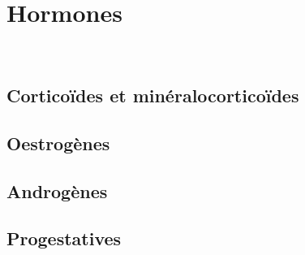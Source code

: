 \section{Hormones}

\begin{boiteCodeTex}{}
  \chemfig{!\creatinine}
  \chemfig{!\DOPA}
  \chemfig{!\DOPAH} \\[8pt]
  \chemfig{!\prostaglandine}
\end{boiteCodeTex}

\subsection{Corticoïdes et minéralocorticoïdes}

\begin{boiteCodeTex}{}
  \chemfig{!\cortisol} \hspace*{-50pt}
  \chemfig{!\corticosterone} \hspace*{-64pt}
  \chemfig{!\aldosterone}
\end{boiteCodeTex}

\subsection{Oestrogènes}

\begin{boiteCodeTex}{}
  \chemfig{!\estrone} \hspace*{-40pt}
  \chemfig{!\estriol} \hspace*{-56pt}
  \chemfig{!\estradiol}
\end{boiteCodeTex}

\subsection{Androgènes}

\begin{boiteCodeTex}{}
  \chemfig{!\testosterone} \hspace*{-12pt}
  \chemfig{!\dihydrotestosterone} \hspace*{-12pt}
  \chemfig{!\androstenedione}
\end{boiteCodeTex}

\begin{boiteCodeTex}{}
  \chemfig{!\DHEA}
  \chemfig{!\DHEAS}
\end{boiteCodeTex}

\subsection{Progestatives}

\begin{boiteCodeTex}{}
  \chemfig{!\progesterone}
\end{boiteCodeTex}
